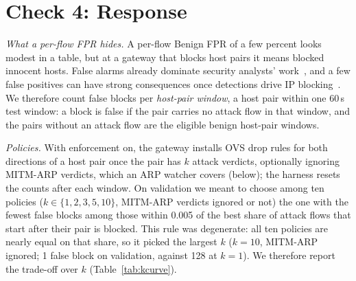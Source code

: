 \section{Check 4: Response}\label{sec:response}

\emph{What a per-flow FPR hides.} A per-flow Benign FPR of a few percent looks modest in a table, but at a gateway that blocks host pairs it means blocked innocent hosts. False alarms already dominate security analysts' work~\cite{alahmadi2022falsepositives}, and a few false positives can have strong consequences once detections drive IP blocking~\cite{garcia2023labeling,akbari2020atmos}. We therefore count false blocks per \emph{host-pair window}, a host pair within one 60\,s test window: a block is false if the pair carries no attack flow in that window, and the pairs without an attack flow are the eligible benign host-pair windows.

\emph{Policies.} With enforcement on, the gateway installs OVS drop rules for both directions of a host pair once the pair has $k$ attack verdicts, optionally ignoring MITM-ARP verdicts, which an ARP watcher covers (below); the harness resets the counts after each window. On validation we meant to choose among ten policies ($k\in\{1,2,3,5,10\}$, MITM-ARP verdicts ignored or not) the one with the fewest false blocks among those within 0.005 of the best share of attack flows that start after their pair is blocked. This rule was degenerate: all ten policies are nearly equal on that share, so it picked the largest $k$ ($k=10$, MITM-ARP ignored; 1 false block on validation, against 128 at $k=1$). We therefore report the trade-off over $k$ (Table~\ref{tab:kcurve}).

